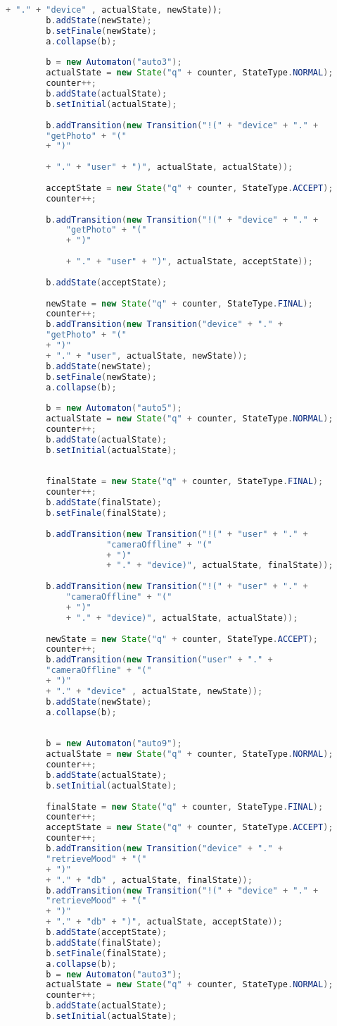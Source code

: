 \begin{lstlisting}[language=java, caption={\textit{Specification} osztály.},captionpos=b,label=specification_class]
		+ "." + "device" , actualState, newState));
		b.addState(newState);
		b.setFinale(newState);
		a.collapse(b);
		
		b = new Automaton("auto3");
		actualState = new State("q" + counter, StateType.NORMAL);
		counter++;
		b.addState(actualState);
		b.setInitial(actualState);
		
		b.addTransition(new Transition("!(" + "device" + "." +
		"getPhoto" + "("
		+ ")"
		
		+ "." + "user" + ")", actualState, actualState));
		
		acceptState = new State("q" + counter, StateType.ACCEPT);
		counter++;
		
		b.addTransition(new Transition("!(" + "device" + "." +
			"getPhoto" + "("
			+ ")"
			
			+ "." + "user" + ")", actualState, acceptState));
		
		b.addState(acceptState);
		
		newState = new State("q" + counter, StateType.FINAL);
		counter++;
		b.addTransition(new Transition("device" + "." +
		"getPhoto" + "("
		+ ")"
		+ "." + "user", actualState, newState));
		b.addState(newState);
		b.setFinale(newState);
		a.collapse(b);
		
		b = new Automaton("auto5");
		actualState = new State("q" + counter, StateType.NORMAL);
		counter++;
		b.addState(actualState);
		b.setInitial(actualState);
											
		
		finalState = new State("q" + counter, StateType.FINAL);
		counter++;
		b.addState(finalState);
		b.setFinale(finalState);
		
		b.addTransition(new Transition("!(" + "user" + "." +
					"cameraOffline" + "("
					+ ")"
					+ "." + "device)", actualState, finalState));
		
		b.addTransition(new Transition("!(" + "user" + "." +
			"cameraOffline" + "("
			+ ")"
			+ "." + "device)", actualState, actualState));
			
		newState = new State("q" + counter, StateType.ACCEPT);
		counter++;
		b.addTransition(new Transition("user" + "." +
		"cameraOffline" + "("
		+ ")"
		+ "." + "device" , actualState, newState));
		b.addState(newState);
		a.collapse(b);
		
		
		b = new Automaton("auto9");
		actualState = new State("q" + counter, StateType.NORMAL);
		counter++;
		b.addState(actualState);
		b.setInitial(actualState);
											
		finalState = new State("q" + counter, StateType.FINAL);
		counter++;
		acceptState = new State("q" + counter, StateType.ACCEPT);
		counter++;
		b.addTransition(new Transition("device" + "." +
		"retrieveMood" + "("
		+ ")"
		+ "." + "db" , actualState, finalState));
		b.addTransition(new Transition("!(" + "device" + "." +
		"retrieveMood" + "("
		+ ")"
		+ "." + "db" + ")", actualState, acceptState));
		b.addState(acceptState);
		b.addState(finalState);
		b.setFinale(finalState);
		a.collapse(b);
		b = new Automaton("auto3");
		actualState = new State("q" + counter, StateType.NORMAL);
		counter++;
		b.addState(actualState);
		b.setInitial(actualState);
		

\end{lstlisting}
